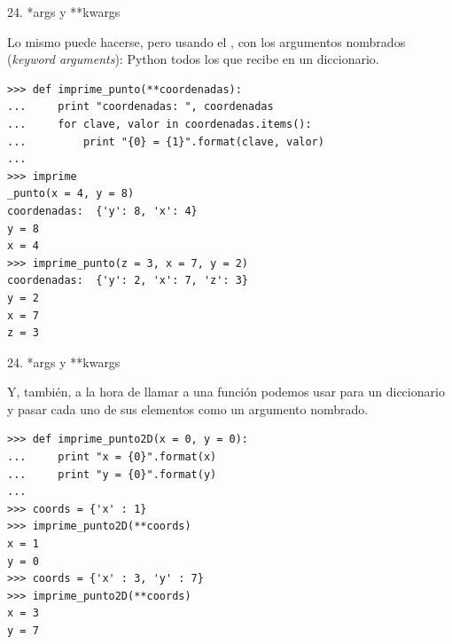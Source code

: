 \documentclass[14pt]{beamer}
\begin{document}
\begin{frame}[fragile]{24. *args y **kwargs}
  \begin{alertblock}{}
    \small
    \centering
    Lo mismo puede hacerse, pero usando el , con los argumentos nombrados (\emph{keyword
      arguments}): Python  todos los que recibe en
    un diccionario.
  \end{alertblock}

  \begin{exampleblock}{}
    \scriptsize
    \begin{lstlisting}
>>> def imprime_punto(**coordenadas):
...     print "coordenadas: ", coordenadas
...     for clave, valor in coordenadas.items():
...         print "{0} = {1}".format(clave, valor)
...
>>> imprime
_punto(x = 4, y = 8)
coordenadas:  {'y': 8, 'x': 4}
y = 8
x = 4
>>> imprime_punto(z = 3, x = 7, y = 2)
coordenadas:  {'y': 2, 'x': 7, 'z': 3}
y = 2
x = 7
z = 3
    \end{lstlisting}
  \end{exampleblock}
\end{frame}

\begin{frame}[fragile]{24. *args y **kwargs}
  \begin{block}{}
    \small
    \centering
    Y, también, a la hora de llamar a una función podemos usar
    \structure{**} para  un diccionario y
    pasar cada uno de sus elementos como un argumento nombrado.
  \end{block}

  \begin{exampleblock}{}
    \scriptsize
    \begin{lstlisting}
>>> def imprime_punto2D(x = 0, y = 0):
...     print "x = {0}".format(x)
...     print "y = {0}".format(y)
...
>>> coords = {'x' : 1}
>>> imprime_punto2D(**coords)
x = 1
y = 0
>>> coords = {'x' : 3, 'y' : 7}
>>> imprime_punto2D(**coords)
x = 3
y = 7
    \end{lstlisting}
  \end{exampleblock}
\end{frame}
\end{document}
